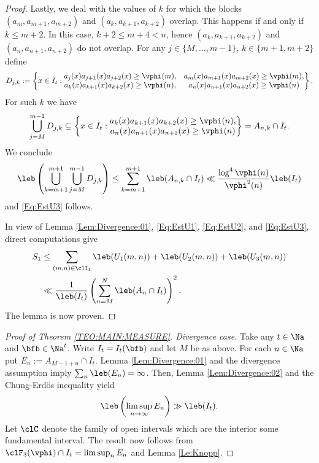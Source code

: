 \documentclass[12pt,a4paper]{amsart}
\begin{document}
\begin{proof}
Lastly, we deal with the values of $k$ for which the blocks $(a_m,a_{m+1}, a_{m+2})$ and $(a_k, a_{k+1}, a_{k+2})$ overlap. This happens if and only if $k\leq m+2$. In this case, $k+ 2 \leq m+4<n$, hence $(a_k, a_{k+1}, a_{k+2})$ and $(a_n, a_{n+1}, a_{n+2})$ do not overlap. For any $j\in \{M, \ldots, m-1\}$, $k\in \{m+1,m+2\}$ define
\[
D_{j,k}
:=
\left\{
x\in I_t:
\begin{matrix}
a_j(x) a_{j+1}(x) a_{j+2}(x)\geq \vphi(m), & a_m(x) a_{m+1}(x) a_{m+2}(x)\geq \vphi(m), \\
a_k(x) a_{k+1}(x) a_{k+2}(x)\geq \vphi(n), & a_n(x) a_{n+1}(x) a_{n+2}(x)\geq \vphi(n)
\end{matrix}
\right\}.
\]
For such $k$ we have
\[
\bigcup_{j=M}^{m-1} D_{j,k}
\subseteq
\left\{
x\in I_t:
\begin{matrix}
a_k(x) a_{k+1}(x) a_{k+2}(x)\geq \vphi(n),\\  
a_n(x) a_{n+1}(x) a_{n+2}(x)\geq \vphi(n)
\end{matrix}
\right\}
=A_{n,k}\cap I_t.
\]
We conclude
\[
\leb
\left( \bigcup_{k=m+1}^{m+1}\bigcup_{j=M}^{m-1} D_{j,k}\right)
\leq 
\sum_{k=m+1}^{m+1} \leb(A_{n,k}\cap I_t)
\ll 
\frac{\log^{4}\vphi(n)}{\vphi^2(n)}\leb(I_t)
\]
and \eqref{Eq:EstU3} follows.

In view of Lemma \ref{Lem:Divergence:01}, \eqref{Eq:EstU1}, \eqref{Eq:EstU2}, and \eqref{Eq:EstU3}, direct computations give
\begin{align*}
S_1
&\leq 
\sum_{(m,n)\in \clI_1} \leb(U_1(m,n)) +\leb(U_2(m,n))+ \leb(U_3(m,n)) \\
&\ll
\frac{1}{\leb(I_t)} \left(\sum_{n=M}^N \leb(A_n\cap I_t)\right)^2.
\end{align*}
The lemma is now proven.
\end{proof}

\begin{proof}[Proof of Theorem \ref{TEO:MAIN:MEASURE}. Divergence case]
Take any $t\in\Na$ and $\bfb\in\Na^t$. Write $I_t=I_t(\bfb)$ and let $M$ be as above. For each $n\in\Na$ put $E_n:=A_{M-1+n} \cap I_t$. Lemma \ref{Lem:Divergence:01} and the divergence assumption imply $\sum_n \leb(E_n)=\infty$. Then, Lemma \ref{Lem:Divergence:02} and the Chung-Erd{\"o}s inequality yield
\[
\leb\left( \limsup_{n\to\infty} E_n\right)
\gg
\leb(I_t).
\]
Let $\clC$ denote the family of open intervals which are the interior some fundamental interval. The result now follows from $\clF_{3}(\vphi)\cap I_t=\limsup_n E_n$ and Lemma \ref{Le:Knopp}.
\end{proof}
\end{document}
